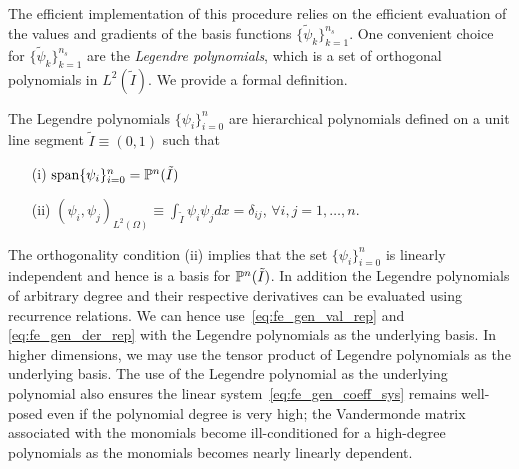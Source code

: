 The efficient implementation of this procedure relies on the efficient evaluation of the values and gradients of the basis functions $\{\tilde \psi_k \}_{k=1}^{n_s}$. One convenient choice for $\{\tilde \psi_k \}_{k=1}^{n_s}$ are the \emph{Legendre polynomials}, which is a set of orthogonal polynomials in $L^2(\tilde I)$. We provide a formal definition.
\begin{definition}
  \label{def:fe_legendre_poly}
  The Legendre polynomials $\{ \psi_i \}_{i=0}^{n}$ are hierarchical polynomials defined on a unit line segment $\tilde I \equiv (0,1)$ such that
  \begin{itemize}
  \item[(i)] $\text{span}\{ \psi_i \}_{i=0}^n = \mathbb{P}^{n}(\tilde I)$  
  \item[(ii)] $(\psi_i,\psi_j)_{L^2(\Omega)} \equiv \int_{\tilde I} \psi_i \psi_j dx =  \delta_{ij}$, $\forall i,j = 1,\dots,n$. 
  \end{itemize}
\end{definition}
The orthogonality condition (ii) implies that the set $\{ \psi_i \}_{i=0}^{n}$ is linearly independent and hence is a basis for $\mathbb{P}^n(\tilde I)$. In addition the Legendre polynomials of arbitrary degree and their respective derivatives can be evaluated using recurrence relations. We can hence use~\eqref{eq:fe_gen_val_rep} and \eqref{eq:fe_gen_der_rep} with the Legendre polynomials as the underlying basis.  In higher dimensions, we may use the tensor product of Legendre polynomials as the underlying basis.  The use of the Legendre polynomial as the underlying polynomial also ensures the linear system~\eqref{eq:fe_gen_coeff_sys} remains well-posed even if the polynomial degree is very high; the Vandermonde matrix associated with the monomials become ill-conditioned for a high-degree polynomials as the monomials becomes nearly linearly dependent.

